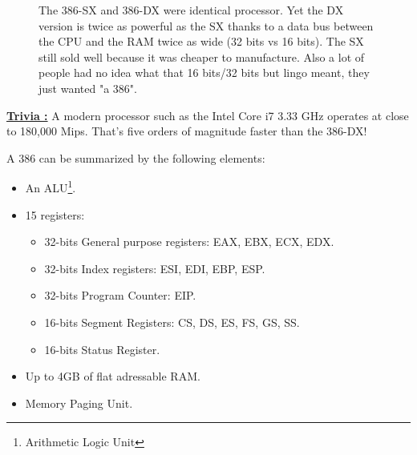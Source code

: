 \documentclass[book.tex]{subfiles}
\begin{document}
\begin{figure}[H]
\centering
   \caption{The 386-SX and 386-DX were identical processor. Yet the DX version is twice as powerful as the SX thanks to a data bus between the CPU and the RAM twice as wide (32 bits vs 16 bits). The SX still sold well because it was cheaper to manufacture. Also a lot of people had no idea what that 16 bits/32 bits but lingo meant, they just wanted "a 386".} \label{fig:mips}
 \end{figure}
 \par
 \textbf{\underline{Trivia :}} A modern processor such as the Intel Core i7 3.33 GHz operates at close to 180,000 Mips. That's five orders of magnitude faster than the 386-DX!\\
\par

A 386 can be summarized by the following elements:
\begin{itemize}
\item An ALU\footnote{Arithmetic Logic Unit}.
\item 15 registers:
\begin{itemize}
  \item 32-bits General purpose registers: EAX, EBX, ECX, EDX.
  \item 32-bits Index registers: ESI, EDI, EBP, ESP.
  \item 32-bits Program Counter: EIP.
  \item 16-bits Segment Registers: CS, DS, ES, FS, GS, SS.
  \item 16-bits Status Register.
\end{itemize}
\item Up to 4GB of flat adressable RAM.
\item Memory Paging Unit.
\end{itemize}
\end{document}
